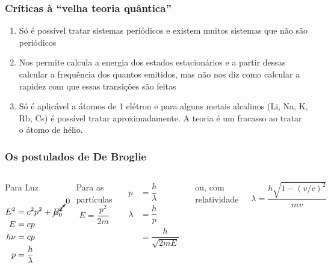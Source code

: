 \documentclass[12pt,brazil]{beamer}
\begin{document}
    
\begin{frame}
  \frametitle{Críticas à ``velha teoria quântica''}
  \fontsize{9pt}{11pt}\selectfont
  
  \begin{enumerate}
   \item Só é possível tratar sistemas periódicos e existem muitos sistemas que não são periódicos
   
   \item Nos permite calcula a energia dos estados estacionários e a partir dessas calcular a frequência dos quantos emitidos, mas não nos diz como calcular a rapidez com que essas transições são feitas
   
   \item Só é aplicável a átomos de 1 elétron e para alguns metais alcalinos (Li, Na, K, Rb, Cs) é possível tratar aproximadamente. A teoria é um fracasso ao tratar o átomo de hélio. 
  \end{enumerate}

  
\end{frame}
    
\begin{frame}
  \frametitle{Os postulados de De Broglie}
  \fontsize{9pt}{11pt}\selectfont
    \begin{columns}[c]

      \column{5cm}
      
    \vspace*{-3.50cm}Para Luz
        \begin{align*}
           E^{2}&=c^{2}p^{2}+\cancelto{0}{E_{0}^{2}}\\
           E &= cp\\
           h\nu &= cp\\
           p &=\dfrac{h}{\lambda}
        \end{align*}

      \column{5cm}
      Para as partículas
      \[
       E = \dfrac{p^2}{2m}
      \]

        \begin{align*}
          p &=\dfrac{h}{\lambda}\\
          \lambda &= \dfrac{h}{p}\\
          &=\dfrac{h}{\sqrt{2mE}}          
        \end{align*}
        
        ou, com relatividade
        
        \[
         \lambda = \dfrac{h\sqrt{1-(v/c)^2}}{mv}
        \]

    \end{columns}
\end{frame}
\end{document}
